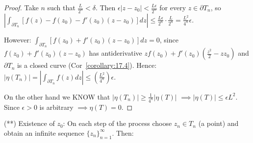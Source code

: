 \begin{proof}
Take $n$ such that $\frac{L}{2^n} < \delta$. Then $\epsilon |z - z_0| < \frac{L\epsilon}{2^n}$ for every $z \in \partial T_n$, so 
$|\int_{\partial T_n} [f(z) - f(z_0) - f'(z_0)(z-z_0)] dz| \leq \frac{L\epsilon}{2^n} \cdot \frac{L}{2^n} = \frac{L^2}{4^n} \epsilon$.

However: $\int_{\partial T_n} [f(z_0) + f'(z_0)(z-z_0)] dz = 0$, since $f(z_0) + f'(z_0)(z-z_0)$ has antiderivative $z f(z_0) + f'(z_0)(\frac{z^2}{2} - z z_0)$ and $\partial T_n$ is a closed 
curve (Cor~\ref{corollary:17.4}). Hence: $|\eta(T_n)| = |\int_{\partial T_n} f(z) dz| \leq (\frac{L^2}{4^n}) \epsilon$.

On the other hand we KNOW that $|\eta(T_n)| \geq \frac{1}{4^n} |\eta(T)|$
$\implies |\eta(T)| \leq \epsilon L^2$. Since $\epsilon > 0$ is arbitrary $\implies \eta(T) = 0$.

\end{proof}
(**) Existence of $z_0$: On each step of the process choose $z_n \in T_n$ (a point) and obtain an infinite sequence $\{z_n\}_{n=1}^\infty$. Then:

